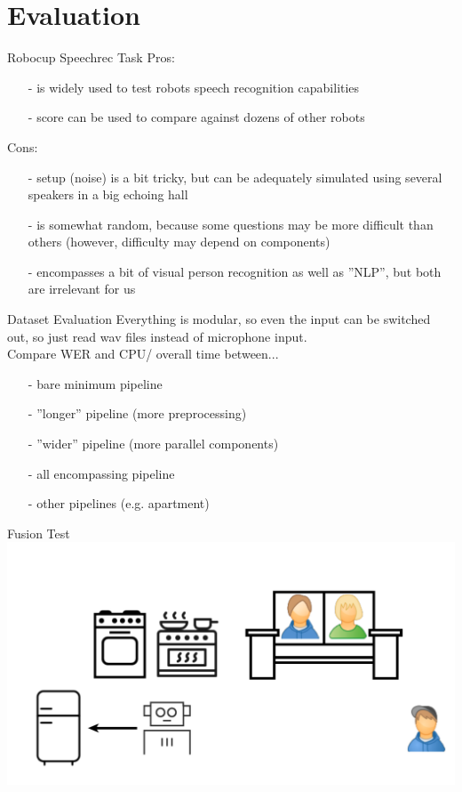 \documentclass{beamer}
\begin{document}
	
	
	
	
	
	
	
	
	\section{Evaluation}
	
	\begin{frame}{Robocup Speechrec Task}
		\pause
		Pros:
		\begin{itemize}
			\item[-] is widely used to test robots speech recognition capabilities
			\item[-] score can be used to compare against dozens of other robots
		\end{itemize}
		\pause
		Cons:
		\begin{itemize}
			\item[-] setup (noise) is a bit tricky, but can be adequately simulated using several speakers in a big echoing hall
			\item[-] is somewhat random, because some questions may be more difficult than others (however, difficulty may depend on components)
			\item[-] encompasses a bit of visual person recognition as well as ''NLP'', but both are irrelevant for us
		\end{itemize}
	\end{frame}
	
	\begin{frame}{Dataset Evaluation}
		Everything is modular, so even the input can be switched out, so just read wav files instead of microphone input.\\

		Compare WER and CPU/ overall time between...
		\begin{itemize}
			\item[-] bare minimum pipeline
			\item[-] ''longer'' pipeline (more preprocessing)
			\item[-] ''wider'' pipeline (more parallel components)
			\item[-] all encompassing pipeline
			\item[-] other pipelines (e.g. apartment)
		\end{itemize}
	\end{frame}
	
	\begin{frame}{Fusion Test}
		\centering
		\includegraphics[width=.75\textwidth]{Bilder/fusion_test_0}
	\end{frame}
	
\end{document}
